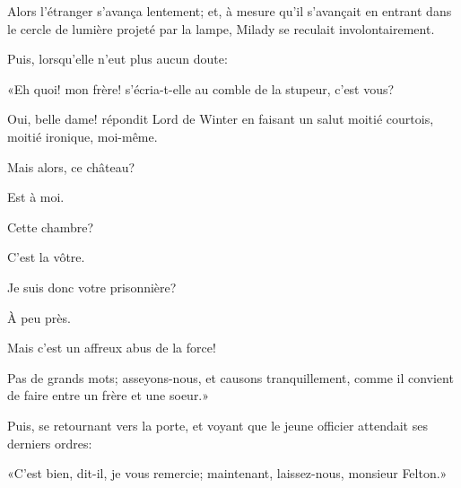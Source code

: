 Alors l'étranger s'avança lentement; et, à mesure qu'il s'avançait en entrant dans le cercle de lumière projeté par la lampe, Milady se reculait involontairement. 

Puis, lorsqu'elle n'eut plus aucun doute: 

«Eh quoi! mon frère! s'écria-t-elle au comble de la stupeur, c'est vous? 

\speak  Oui, belle dame! répondit Lord de Winter en faisant un salut moitié courtois, moitié ironique, moi-même. 

\speak  Mais alors, ce château? 

\speak  Est à moi. 

\speak  Cette chambre? 

\speak  C'est la vôtre. 

\speak  Je suis donc votre prisonnière? 

\speak  À peu près. 

\speak  Mais c'est un affreux abus de la force! 

\speak  Pas de grands mots; asseyons-nous, et causons tranquillement, comme il convient de faire entre un frère et une soeur.» 

Puis, se retournant vers la porte, et voyant que le jeune officier attendait ses derniers ordres: 

«C'est bien, dit-il, je vous remercie; maintenant, laissez-nous, monsieur Felton.» 